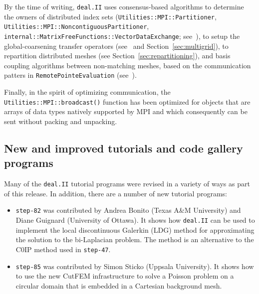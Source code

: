 \documentclass{ansarticle-preprint}
\newcommand{\specialword}[1]{\texttt{#1}}
\newcommand{\dealii}{{\specialword{deal.II}}\xspace}
\begin{document}
By the time of writing, \dealii uses consensus-based algorithms to determine
the owners of distributed index sets (\texttt{Utilities::MPI::Partitioner},
\texttt{Utilities::MPI::Noncontiguous\allowbreak Partitioner}, \texttt{internal::MatrixFreeFunctions::VectorDataExchange}; see~\cite{dealII91}),
to setup the global-coarsening transfer operators (see~\cite{dealII92} and
Section~\ref{sec:multigrid}), to repartition distributed meshes (see Section~\ref{sec:repartitioning}), and basis coupling algorithms between non-matching
meshes, based on the communication patters in \texttt{RemotePointeEvaluation} (see~\cite{dealII92}).

Finally, in the spirit of optimizing communication, the
\texttt{Utilities::MPI::broadcast()} function has been optimized for
objects that are arrays of data types natively supported by MPI and
which consequently can be sent without packing and unpacking.





\subsection{New and improved tutorials and code gallery programs}
\label{subsec:steps}

Many of the \dealii{} tutorial programs were revised in a variety of
ways as part of this release. In addition, there are a number of new tutorial programs:
\begin{itemize}
\item \texttt{step-82} was contributed by Andrea Bonito (Texas A\&M University) and Diane Guignard (University of Ottawa). It shows how
\dealii{} can be used to implement the
local discontinuous Galerkin (LDG) method for approximating the
solution to the bi-Laplacian problem. The method is an alternative to
the C0IP method used in \texttt{step-47}.

\item \texttt{step-85} was contributed by Simon Sticko (Uppsala University). It shows how to use the new CutFEM infrastructure to solve a Poisson
problem on a circular domain that is embedded in a Cartesian background mesh.
\end{itemize}
\end{document}
